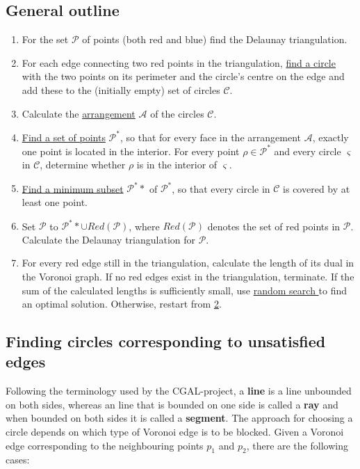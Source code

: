 \documentclass[a4paper,12pt]{article}
\begin{document}
\subsection{General outline}
\label{ref:Algorithm}
\begin{enumerate}
\item
For the set $\mathcal P$ of points (both red and blue) find the Delaunay triangulation.
\item
\label{alg:part2}
For each edge connecting two red points in the triangulation, \hyperref[sec:findCircle]{find a circle} with the two points on its perimeter and the circle's centre on the edge and add these to the (initially empty) set of circles $\mathcal C$.
\item
Calculate the \hyperref[sec:arrangement]{arrangement} $\mathcal A$ of the circles $\mathcal C$.
\item
\hyperref[sec:findPoints]{Find a set of points} $\mathcal P^*$, so that for every face in the arrangement $\mathcal A$, exactly one point is located in the interior. For every point $\rho  \in \mathcal P^*$ and every circle $\varsigma$ in $\mathcal C$, determine whether $\rho$ is in the interior of $\varsigma$.
\item
\hyperref[sec:gurobi]{Find a minimum subset} $\mathcal P^**$ of $\mathcal P^*$, so that every circle in $\mathcal C$ is covered by at least one point.
\item
Set $\mathcal P$ to $\mathcal P^** \cup Red(\mathcal P )$, where  $Red(\mathcal P )$ denotes the set of red points in $\mathcal P$. Calculate the Delaunay triangulation for $\mathcal P$.
\item
For every red edge still in the triangulation, calculate the length of its dual in the Voronoi graph. If no red edges exist in the triangulation, terminate. If the sum of the calculated lengths is sufficiently small, use \hyperref[sec:rand]{random search } to find an optimal solution. Otherwise, restart from \hyperref[alg:part2]{2}.
\end{enumerate}

\subsection{Finding circles corresponding to unsatisfied edges}
\label{sec:findCircle}
Following the terminology used by the CGAL-project, a {\bf line} is a line unbounded on both sides, whereas an line that is bounded on one side is called a {\bf ray} and when bounded on both sides it is called a {\bf segment}. \newline 
The approach for choosing a circle depends on which type of Voronoi edge is to be blocked. Given a Voronoi edge corresponding to the neighbouring points $p_1$ and $p_2$, there are the following cases:
\end{document}
